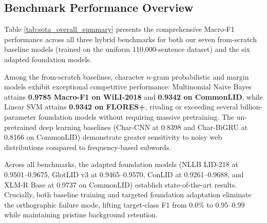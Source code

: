 \documentclass[11pt]{article}
\begin{document}
\subsection{Benchmark Performance Overview}
Table \ref{tab:sota_overall_summary} presents the comprehensive Macro-F1 performance across all three hybrid benchmarks for both our seven from-scratch baseline models (trained on the uniform 110,000-sentence dataset) and the six adapted foundation models. 

Among the from-scratch baselines, character $n$-gram probabilistic and margin models exhibit exceptional competitive performance: Multinomial Naive Bayes attains \textbf{0.9785 Macro-F1 on WiLI-2018} and \textbf{0.9342 on CommonLID}, while Linear SVM attains \textbf{0.9342 on FLORES+}, rivaling or exceeding several billion-parameter foundation models without requiring massive pretraining. The un-pretrained deep learning baselines (Char-CNN at 0.8398 and Char-BiGRU at 0.8166 on CommonLID) demonstrate greater sensitivity to noisy web distributions compared to frequency-based subwords.

Across all benchmarks, the adapted foundation models (NLLB LID-218 at 0.9501--0.9675, GlotLID v3 at 0.9465--0.9570, ConLID at 0.9261--0.9688, and XLM-R Base at 0.9737 on CommonLID) establish state-of-the-art results. Crucially, both baseline training and targeted foundation adaptation eliminate the orthographic failure mode, lifting target-class F1 from 0.0\% to 0.95--0.99 while maintaining pristine background retention.
\end{document}
